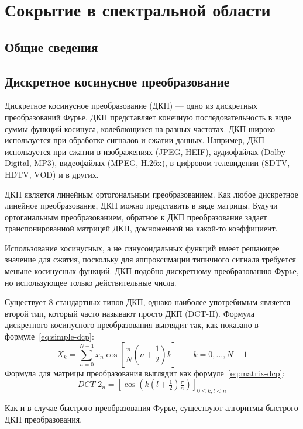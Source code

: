 \chapter{Сокрытие в спектральной области}
\section{Общие сведения}

\section{Дискретное косинусное преобразование}
Дискретное косинусное преобразование (ДКП) --- одно из дискретных преобразований Фурье.
ДКП представляет конечную последовательность в виде суммы функций косинуса,
колеблющихся на разных частотах. ДКП широко используется при обработке сигналов и сжатии данных.
Например, ДКП используется при сжатии в изображениях (JPEG, HEIF), аудиофайлах (Dolby Digital, MP3),
видеофайлах (MPEG, H.26x), в цифровом телевидении (SDTV, HDTV, VOD) и в других.

ДКП является линейным ортогональным преобразованием. Как любое дискретное линейное преобразование,
ДКП можно представить в виде матрицы. Будучи ортоганальным преобразованием, обратное к ДКП преобразование
задает транспонированной матрицей ДКП, домноженной на какой-то коэффициент.

Использование косинусных, а не синусоидальных функций имеет решающее значение для сжатия,
поскольку для аппроксимации типичного сигнала требуется меньше косинусных функций.
ДКП подобно дискретному преобразованию Фурье, но использующее только действительные числа.

Существует 8 стандартных типов ДКП, однако наиболее употребимым является второй тип,
который часто называют просто ДКП (DCT-II).
Формула дискретного косинусного преобразования выглядит так,
как показано в формуле~\ref{eq:simple-dcp}:
\begin{equation} \label{eq:simple-dcp}
    X_k = \sum_{n=0}^{N-1} x_n \cos \left[\frac{\pi}{N} \left(n+\frac{1}{2}\right) k \right] \quad \quad k = 0, \dots, N-1    
\end{equation}
Формула для матрицы преобразования выглядит как формуле~\ref{eq:matrix-dcp}:
\begin{equation} \label{eq:matrix-dcp}
    {DCT}\text{-}2_n= \left[\cos (k(l+\tfrac{1}{2})\tfrac{\pi}{n})\right]_{0\leq k,l<n}    
\end{equation}

Как и в случае быстрого преобразования Фурье, существуют алгоритмы быстрого ДКП преобразования.

